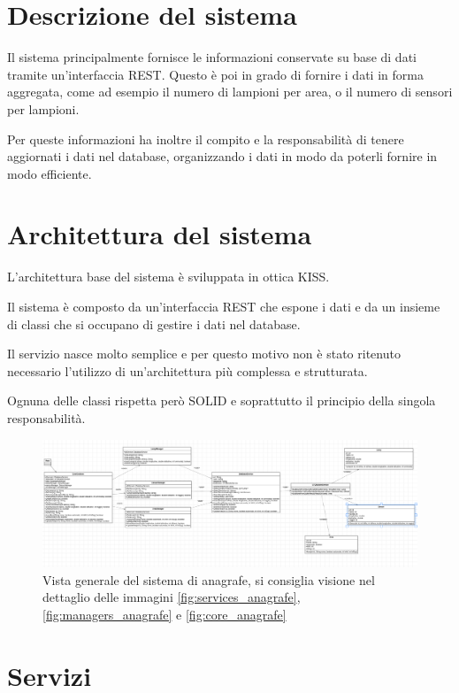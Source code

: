 \section{Descrizione del sistema}

Il sistema principalmente fornisce le informazioni conservate su base di dati tramite un'interfaccia REST.
Questo è poi in grado di fornire i dati in forma aggregata, come ad esempio il numero di lampioni per area, o il numero di sensori per lampioni.

Per queste informazioni ha inoltre il compito e la responsabilità di tenere aggiornati i dati nel database, organizzando i dati in modo da poterli fornire in modo efficiente.

\section{Architettura del sistema}

L'architettura base del sistema è sviluppata in ottica KISS.

Il sistema è composto da un'interfaccia REST che espone i dati e da un insieme di classi che si occupano di gestire i dati nel database.

Il servizio nasce molto semplice e per questo motivo non è stato ritenuto necessario l'utilizzo di un'architettura più complessa e strutturata.

Ognuna delle classi rispetta però SOLID e soprattutto il principio della singola responsabilità.

\begin{figure}[ht]
    \centering
    \includegraphics[width=\textwidth]{img/anagrafe_generale.png}
    \caption{Vista generale del sistema di anagrafe, si consiglia visione nel dettaglio delle immagini \ref{fig:services_anagrafe}, \ref{fig:managers_anagrafe} e \ref{fig:core_anagrafe}}
    \label{fig:general_anagrafe}
\end{figure}

\section{Servizi}

